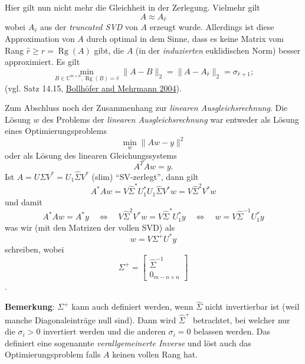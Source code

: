 \documentclass[
]{book}
\theoremstyle{definition}
\theoremstyle{definition}
\theoremstyle{definition}
\theoremstyle{definition}
\theoremstyle{remark}
\begin{document}
Hier gilt nun nicht mehr die Gleichheit in der Zerlegung. Vielmehr gilt
\begin{equation*}
A \approx A_{\hat r}
\end{equation*}
wobei \(A_{\hat r}\) aus der \emph{truncated SVD} von \(A\) erzeugt wurde. Allerdings ist diese Approximation von \(A\) durch optimal in dem Sinne, dass es keine Matrix vom Rang \(\hat r \geq r=\operatorname{Rg}(A)\) gibt, die \(A\) (in der \emph{induzierten} euklidischen Norm) besser approximiert. Es gilt
\begin{equation*}
\min_{B\in \mathbb C^{m\times n}, \operatorname{Rg}(B)=\hat r} \|A-B\|_2 = \|A-A_{\hat r}\|_2 = \sigma_{\hat r + 1};
\end{equation*}
(vgl. Satz 14.15, \protect\hyperlink{ref-BolM04}{Bollhöfer and Mehrmann 2004}).

Zum Abschluss noch der Zusammenhang zur \emph{linearen Ausgleichsrechnung}.
Die Lösung \(w\) des Problems der \emph{linearen Ausgleichsrechnung} war entweder als Lösung eines Optimierungsproblems
\begin{equation*}
\min_{w} \| Aw - y \|^2
\end{equation*}
oder als Lösung des linearen Gleichungssystems
\begin{equation*}
A^TAw=y.
\end{equation*}
Ist \(A=U\Sigma V^*=U_1\hat \Sigma V^*\) (slim) ``SV-zerlegt'', dann gilt
\begin{equation*}
A^*Aw = V\hat \Sigma^*U_1^*U_1\hat \Sigma V^*w = V\hat \Sigma^2 V^* w
\end{equation*}
und damit
\begin{equation*}
A^*Aw = A^*y \quad \Leftrightarrow \quad V\hat \Sigma^2 V^*w  = V\hat \Sigma^*U_1^*y \quad \Leftrightarrow \quad w = V\hat \Sigma^{-1} U_1^*y
\end{equation*}
was wir (mit den Matrizen der vollen SVD) als
\begin{equation*}
w = V \Sigma^+ U^*y
\end{equation*}
schreiben, wobei
\begin{equation*}
\Sigma^+ = \begin{bmatrix}
\hat \Sigma^{-1} \\ 0_{m-n \times n}
\end{bmatrix}
\end{equation*}
.

\textbf{Bemerkung}: \(\Sigma^+\) kann auch definiert werden, wenn \(\hat \Sigma\) nicht invertierbar ist (weil manche Diagonaleinträge null sind). Dann wird \(\hat \Sigma^+\) betrachtet, bei welcher nur die \(\sigma_i>0\) invertiert werden und die anderen \(\sigma_i=0\) belassen werden. Das definiert eine sogenannte \emph{verallgemeinerte Inverse} und löst auch das Optimierungsproblem falls \(A\) keinen vollen Rang hat.
\end{document}

